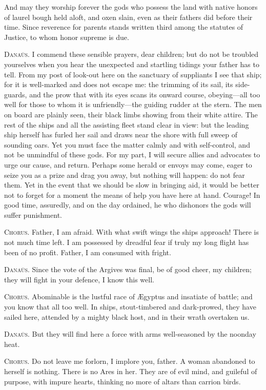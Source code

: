 \documentclass[12pt]{article}
\begin{document}
And may they worship forever the gods who possess the land with native honors of laurel bough held aloft, and oxen slain, even as their fathers did before their time. Since reverence for parents stands written third among the statutes of Justice, to whom honor supreme is due.

\textsc{Dana\"{u}s.} I commend these sensible prayers, dear children; but do not be troubled yourselves when you hear the unexpected and startling tidings your father has to tell. From my post of look-out here on the sanctuary of suppliants I see that ship; for it is well-marked and does not escape me: the trimming of its sail, its side-guards, and the prow that with its eyes scans its onward course, obeying---all too well for those to whom it is unfriendly---the guiding rudder at the stern. The men on board are plainly seen, their black limbs showing from their white attire. The rest of the ships and all the assisting fleet stand clear in view: but the leading ship herself has furled her sail and draws near the shore with full sweep of sounding oars. Yet you must face the matter calmly and with self-control, and not be unmindful of these gods. For my part, I will secure allies and advocates to urge our cause, and return. Perhaps some herald or envoys may come, eager to seize you as a prize and drag you away, but nothing will happen: do not fear them. Yet in the event that we should be slow in bringing aid, it would be better not to forget for a moment the means of help you have here at hand. Courage! In good time, assuredly, and on the day ordained, he who dishonors the gods will suffer punishment.

\textsc{Chorus.} Father, I am afraid. With what swift wings the ships approach! There is not much time left. I am possessed by dreadful fear if truly my long flight has been of no profit. Father, I am consumed with fright.

\textsc{Dana\"{u}s.} Since the vote of the Argives was final, be of good cheer, my children; they will fight in your defence, I know this well.

\textsc{Chorus.} Abominable is the lustful race of {\AE}gyptus and insatiate of battle; and you know that all too well. In ships, stout-timbered and dark-prowed, they have sailed here, attended by a mighty black host, and in their wrath overtaken us.

\textsc{Dana\"{u}s.} But they will find here a force with arms well-seasoned by the noonday heat.

\textsc{Chorus.} Do not leave me forlorn, I implore you, father. A woman abandoned to herself is nothing. There is no Ares in her. They are of evil mind, and guileful of purpose, with impure hearts, thinking no more of altars than carrion birds.
\end{document}
